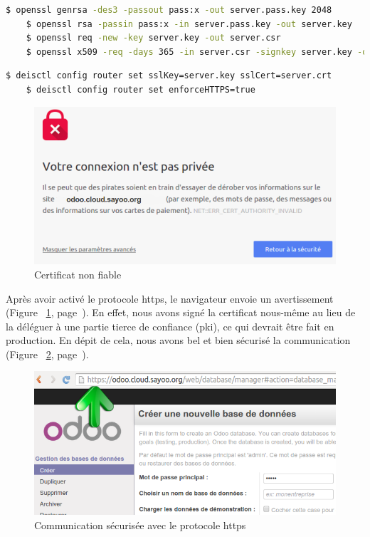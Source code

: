 \begin{onehalfspace}
\begin{lstlisting}[language=bash,caption=Génération de la clé privée eet la certificat]
	$ openssl genrsa -des3 -passout pass:x -out server.pass.key 2048
	$ openssl rsa -passin pass:x -in server.pass.key -out server.key
	$ openssl req -new -key server.key -out server.csr
	$ openssl x509 -req -days 365 -in server.csr -signkey server.key -out server.crt
\end{lstlisting}

\begin{lstlisting}[language=bash,caption=Activation du protocole SSL]
	$ deisctl config router set sslKey=server.key sslCert=server.crt
	$ deisctl config router set enforceHTTPS=true
\end{lstlisting}

\begin{figure}[H]
\centering
\includegraphics [scale=0.5]{chapitre5/assets/certificat}
\caption{Certificat non fiable}
\label{fig:certificat}
\end{figure}

Après avoir activé le protocole \acrshort{https}, le navigateur envoie un avertissement (Figure ~\ref{fig:certificat}, page~\pageref{fig:certificat}). En effet, nous avons signé la certificat nous-même au lieu de la déléguer à une partie tierce de confiance (\acrshort{pki}), ce qui devrait être fait en production. En dépit de cela, nous avons bel et bien sécurisé la communication (Figure ~\ref{fig:https}, page~\pageref{fig:https}).

\begin{figure}[H]
\centering
\includegraphics [scale=0.5]{chapitre5/assets/https}
\caption{Communication sécurisée avec le protocole \acrshort{https}}
\label{fig:https}
\end{figure}



\end{onehalfspace}
